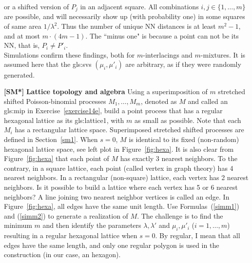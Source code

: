 \documentclass[10pt]{article}
\begin{document}
\begin{Exercise}
or a shifted version of $P_j$ in an adjacent square. All combinations $i,j\in\{1,\dots,m\}$ are possible, and will necessarily show up (with probability one) in some squares of same area $1/\lambda^2$. Thus the number of unique NN distances is at least $m^2-1$, and at most $m\cdot(4m-1)$. The ``minus one" is because a point can not be its NN, that is, $P_i\neq P'_i$. \vspace{1ex} \\
Simulations confirm these findings, both for $m$-interlacings and $m$-mixtures. It is assumed here that the
\glspl{gls:sv} $(\mu_i,\mu'_i)$ are arbitrary, as if they were randomly generated.
\end{Exercise}

\begin{Exercise}\label{exercise14f}{\bf [SM*]} {\bf Lattice topology and algebra} Using a superimposition of $m$ stretched shifted Poisson-binomial processes $M_1,\dots,M_m$, denoted as $M$ and called an
\gls{gls:mip}
in Exercise~\ref{exercise14e}, build a point process
that has a regular \textcolor{index}{hexagonal lattice} as its
\gls{gls:lattice1}, 
with $m$ as small as possible. Note that each $M_i$ has a
rectangular lattice space. Superimposed stretched shifted processes are defined in Section~\ref{sm1}. When $s=0$, $M$ is identical to its fixed (non-random) hexagonal lattice space, see left plot in Figure~\ref{fig:hexa}.  It is also clear from Figure~\ref{fig:hexa} that each point of $M$ has exactly 3 nearest neighbors. To the contrary, in a square lattice, each point (called
\textcolor{index}{vertex} in
\textcolor{index}{graph theory}) has 4 nearest neighbors. In a rectangular (non-square) lattice, each vertex
has 2 nearest neighbors. Is it possible to build a lattice where each vertex has 5 or 6 nearest neighbors? A line joining two nearest neighbor vertices is called an \textcolor{index}{edge}. In Figure~\ref{fig:hexa}, all edges have the same unit length.
Use Formulas~(\ref{simm1}) and (\ref{simm2}) to generate a realization of $M$. The challenge is to find the minimum $m$ and then identify the parameters $\lambda,\lambda'$ and $\mu_i,\mu'_i$ ($i=1,\dots,m$) resulting in a regular hexagonal lattice when $s=0$. By regular, I mean that all edges have the same length, and only one regular polygon is used in the construction (in our case, an hexagon). \vspace{1ex} \\

\end{Exercise}
\end{document}
